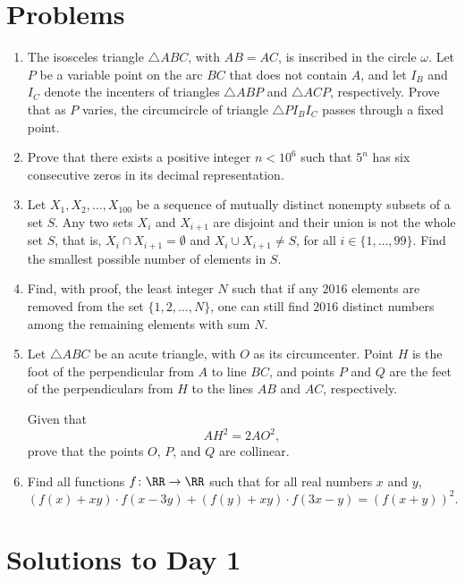 \documentclass[11pt]{scrartcl}
\begin{document}
\section{Problems}
\begin{enumerate}[\bfseries 1.]
\item %
The isosceles triangle $\triangle ABC$, with $AB=AC$,
is inscribed in the circle $\omega$.
Let $P$ be a variable point on the arc $BC$
that does not contain $A$,
and let $I_B$ and $I_C$ denote the incenters of
triangles $\triangle ABP$ and $\triangle ACP$, respectively.
Prove that as $P$ varies, the circumcircle
of triangle $\triangle PI_{B}I_{C}$ passes through a fixed point.

\item %
Prove that there exists a positive integer $n < 10^6$
such that $5^n$ has six consecutive zeros in its decimal representation.

\item %
Let $X_1, X_2, \dots, X_{100}$ be a sequence of mutually distinct nonempty subsets of a set $S$.
Any two sets $X_i$ and $X_{i+1}$ are disjoint and their
union is not the whole set $S$,
that is, $X_i\cap X_{i+1}=\emptyset$ and $X_i\cup X_{i+1}\neq S$,
for all $i\in\{1, \dots, 99\}$.
Find the smallest possible number of elements in $S$.

\item %
Find, with proof, the least integer $N$ such that
if any $2016$ elements are removed
from the set $\{1, 2, \dots, N\}$,
one can still find $2016$ distinct numbers
among the remaining elements with sum $N$.

\item %
Let $\triangle ABC$ be an acute triangle, with $O$ as its circumcenter.
Point $H$ is the foot of the perpendicular from $A$ to line $BC$,
and points $P$ and $Q$ are the feet of the perpendiculars
from $H$ to the lines $AB$ and $AC$, respectively.

Given that \[ AH^2 = 2AO^2, \]
prove that the points $O$, $P$, and $Q$ are collinear.

\item %
Find all functions $f \colon \RR \to \RR$ such that
for all real numbers $x$ and $y$,
\[ (f(x)+xy) \cdot f(x-3y)
 + (f(y)+xy) \cdot f(3x-y)
 = (f(x+y))^2. \]

\end{enumerate}
\pagebreak

\section{Solutions to Day 1}
\end{document}
